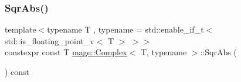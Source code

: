 \mbox{\label{structmage_1_1_complex_a7b9336429e093a97d97e482d551d88ca}} 
\subsubsection{\texorpdfstring{Sqr\+Abs()}{SqrAbs()}}
{\footnotesize\ttfamily template$<$typename T , typename  = std\+::enable\+\_\+if\+\_\+t$<$ std\+::is\+\_\+floating\+\_\+point\+\_\+v$<$ T $>$ $>$$>$ \\
constexpr const T \mbox{\hyperlink{structmage_1_1_complex}{mage\+::\+Complex}}$<$ T, typename $>$\+::Sqr\+Abs (\begin{DoxyParamCaption}{ }\end{DoxyParamCaption}) const\hspace{0.3cm}{\ttfamily [noexcept]}}

